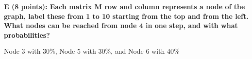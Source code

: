 \documentclass{report}
\begin{document}

\begin{flushleft}
\textbf{E (8 points): Each matrix M row and column represents a node of the graph, label these from 1 to 10 starting from the top and from the left. What nodes can be reached from node 4 in one step, and with what probabilities?}
\end{flushleft}

\begin{flushleft}
[0 0 .3 0 .3 .4 0 0 0 0]
\end{flushleft}

\begin{flushleft}
Node 3 with 30\%, Node 5 with 30\%, and Node 6 with 40\%
\end{flushleft}
 
 
\end{document}
